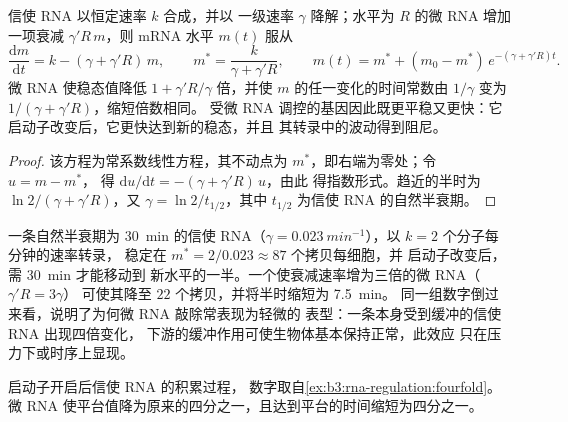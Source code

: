 \begin{theorem}\label{thm:b3:rna-regulation:mirna-kinetics}
信使 RNA 以恒定速率 $k$ 合成，并以
一级速率 $\gamma$ 降解；水平为 $R$ 的微 RNA 增加一项衰减
$\gamma' R\, m$，则 mRNA 水平 $m(t)$ 服从
\[
\frac{\mathrm{d}m}{\mathrm{d}t} = k - (\gamma + \gamma' R)\, m,
\qquad
m^{*} = \frac{k}{\gamma + \gamma' R},
\qquad
m(t) = m^{*} + (m_{0} - m^{*})\,e^{-(\gamma + \gamma' R)t}.
\]
微 RNA 使稳态值降低 $1 + \gamma' R/
\gamma$ 倍，并使 $m$ 的任一变化的时间常数由
$1/\gamma$ 变为 $1/(\gamma + \gamma' R)$，缩短倍数相同。
受微 RNA 调控的基因因此既更平稳又更快：它
启动子改变后，它更快达到新的稳态，并且
其转录中的波动得到阻尼。
\end{theorem}
\begin{proof}
该方程为常系数线性方程，其不动点为
$m^{*}$，即右端为零处；令 $u = m - m^{*}$，
得 $\mathrm{d}u/\mathrm{d}t = -(\gamma + \gamma' R)\,u$，由此
得指数形式。趋近的半时为 $\ln 2/(\gamma + \gamma'
R)$，又 $\gamma = \ln 2 / t_{1/2}$，其中 $t_{1/2}$ 为信使
RNA 的自然半衰期。
\end{proof}

\begin{example}[四倍抑制]\label{ex:b3:rna-regulation:fourfold}
一条自然半衰期为 \qty{30}{min} 的信使 RNA（$\gamma =
\qty{0.023}{min^{-1}}$），以 $k = 2$ 个分子每分钟的速率转录，
稳定在 $m^{*} = 2/0.023 \approx 87$ 个拷贝每细胞，并
启动子改变后，需 \qty{30}{min} 才能移动到
新水平的一半。一个使衰减速率增为三倍的微 RNA（$\gamma' R = 3\gamma$）
可使其降至 $22$ 个拷贝，并将半时缩短为 \qty{7.5}{min}。
同一组数字倒过来看，说明了为何微 RNA 敲除常表现为轻微的
表型：一条本身受到缓冲的信使 RNA 出现四倍变化，
下游的缓冲作用可使生物体基本保持正常，此效应
只在压力下或时序上显现。
\end{example}

\begin{omfigure}

{\small 启动子开启后信使 RNA 的积累过程，
数字取自\cref{ex:b3:rna-regulation:fourfold}。
微 RNA 使平台值降为原来的四分之一，且达到平台的时间缩短为四分之一。}
\end{omfigure}

